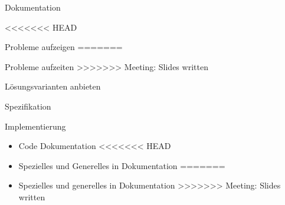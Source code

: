 \begin{frame}[t]{Dokumentation}
  \begin{bigitemize}[<+->]{3mm}
<<<<<<< HEAD
		\item Probleme aufzeigen
=======
		\item Probleme aufzeiten
>>>>>>> Meeting: Slides written
		\item Lösungsvarianten anbieten
		\item Spezifikation
		\item Implementierung
		\begin{itemize}
			\item Code Dokumentation
<<<<<<< HEAD
			\item Spezielles und Generelles in Dokumentation
=======
			\item Spezielles und generelles in Dokumentation
>>>>>>> Meeting: Slides written
		\end{itemize}
	\end{bigitemize}
\end{frame}
